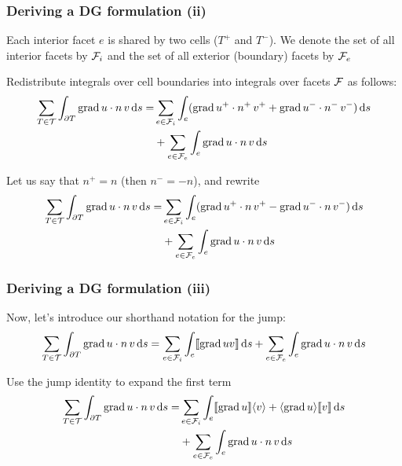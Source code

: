 \documentclass{fenicscourse}
\begin{document}
\begin{frame}
  \frametitle{Deriving a DG formulation (ii)}

  \bigskip

  Each interior facet $e$ is shared by two cells ($T^+$ and $T^-$). We
  denote the set of all interior facets by $\mathcal{F}_i$ and the set of
  all exterior (boundary) facets by $\mathcal{F}_e$

  \bigskip

  Redistribute integrals over cell boundaries into integrals over
  facets $\mathcal{F}$ as follows:
  \small
  \begin{equation*}
    \begin{split}
     \sum_{T \in \mathcal{T} } \int_{\partial T} \operatorname{\mathrm{grad}} u \cdot n \, v \, \mathrm{d}s
    =
    & \sum_{e \in \mathcal{F}_i } \int_{e} (\operatorname{\mathrm{grad}} u^+ \cdot n^+ \, v^+  +  \operatorname{\mathrm{grad}} u^- \cdot n^- \, v^-) \, \mathrm{d}s  \\
    & + \sum_{e \in \mathcal{F}_e } \int_{e} \operatorname{\mathrm{grad}} u \cdot n \, v \, \mathrm{d}s
    \end{split}
  \end{equation*}

  \normalsize
  Let us say that $n^+ = n$ (then $n^- = -n$), and rewrite
  \small
  \begin{equation*}
    \begin{split}
     \sum_{T \in \mathcal{T} } \int_{\partial T} \operatorname{\mathrm{grad}} u \cdot n \, v \, \mathrm{d}s
    =
    & \sum_{e \in \mathcal{F}_i } \int_{e} (\operatorname{\mathrm{grad}} u^+ \cdot n \, v^+ - \operatorname{\mathrm{grad}} u^- \cdot n \, v^-) \, \mathrm{d}s  \\
    & + \sum_{e \in \mathcal{F}_e } \int_{e} \operatorname{\mathrm{grad}} u \cdot n \, v \, \mathrm{d}s
    \end{split}
  \end{equation*}

  \normalsize
\end{frame}



\begin{frame}
  \frametitle{Deriving a DG formulation (iii)}

  Now, let's introduce our shorthand notation for the jump:
  \begin{equation*}
    \begin{split}
     \sum_{T \in \mathcal{T} } \int_{\partial T} \operatorname{\mathrm{grad}} u \cdot n \, v \, \mathrm{d}s
    =
    \sum_{e \in \mathcal{F}_i } \int_{e} \llbracket \operatorname{\mathrm{grad}} u v \rrbracket \, \mathrm{d}s
    + \sum_{e \in \mathcal{F}_e } \int_{e} \operatorname{\mathrm{grad}} u \cdot n \, v \, \mathrm{d}s
    \end{split}
  \end{equation*}

  Use the jump identity to expand the first term
  \begin{equation*}
    \begin{split}
     \sum_{T \in \mathcal{T} } \int_{\partial T} \operatorname{\mathrm{grad}} u \cdot n \, v \, \mathrm{d}s
    =
    &\sum_{e \in \mathcal{F}_i } \int_{e} \llbracket \operatorname{\mathrm{grad}} u \rrbracket \langle v \rangle
    + \langle \operatorname{\mathrm{grad}} u \rangle \llbracket v \rrbracket \, \mathrm{d}s \\
    &+ \sum_{e \in \mathcal{F}_e } \int_{e} \operatorname{\mathrm{grad}} u \cdot n \, v \, \mathrm{d}s
    \end{split}
  \end{equation*}

\end{frame}
\end{document}
